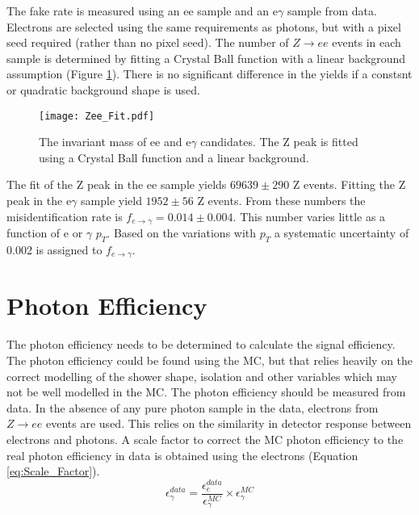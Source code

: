 The fake rate is measured using an ee sample and an e$\gamma$ sample from data.
Electrons are selected using the same requirements as photons, but with a pixel
seed required (rather than no pixel seed). The number of $Z\rightarrow ee$
events in each sample is determined by fitting a Crystal Ball function with a
linear background assumption (Figure \ref{fig:Zee_Fit}). There is no significant
difference in the yields if a constsnt or quadratic background shape is used. \\

\begin{figure}
\begin{center}
\texttt{[image: Zee\_Fit.pdf]}
\end{center}
\caption{The invariant mass of ee and e$\gamma$ candidates. The Z peak is fitted
using a Crystal Ball function and a linear background.}
\label{fig:Zee_Fit}
\end{figure}

The fit of the Z peak in the ee sample yields $69639 \pm 290$ Z events. Fitting
the Z peak in the e$\gamma$ sample yield $1952\pm56$ Z events. From these
numbers the misidentification rate is $f_{e\rightarrow\gamma} = 0.014\pm0.004$.
This number varies little as a function of e or $\gamma$ $p_{T}$. Based on the
variations with $p_{T}$ a systematic uncertainty of 0.002 is assigned to
$f_{e\rightarrow\gamma}$. 

\section{Photon Efficiency}

The photon efficiency needs to be determined to calculate the signal efficiency.
The photon efficiency could be found using the MC, but that relies heavily on
the correct modelling of the shower shape, isolation and other variables which
may not be well modelled in the MC. The photon efficiency should be measured
from data. In the absence of any pure photon sample in the data, electrons from 
$Z\rightarrow ee$ events are used. This relies on the similarity in detector 
response between electrons and photons. A scale factor to correct the MC photon
efficiency to the real photon efficiency in data is obtained using the
electrons (Equation \ref{eq:Scale_Factor}). \\

\begin{equation}
\epsilon_{\gamma}^{data} = \frac{\epsilon_{e}^{data}}{\epsilon_{\gamma}^{MC}}
\times \epsilon_{\gamma}^{MC}
\label{eq:Scale_Factor}
\end{equation}  

